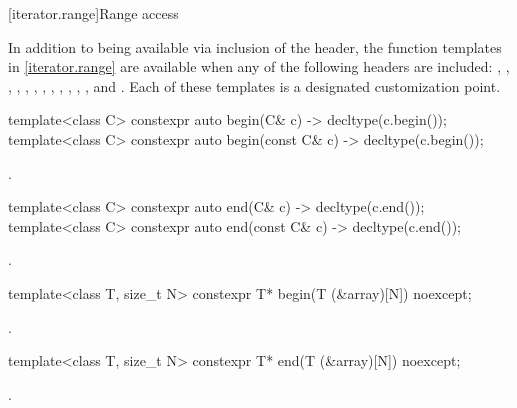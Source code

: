 [iterator.range]{Range access}

\pnum
In addition to being available via inclusion of the  header,
the function templates in \ref{iterator.range} are available when any of the following
headers are included:
,
,
,
,
,
,
,
,
,
,
,
, and
.
Each of these templates
is a designated customization point.

%
\begin{itemdecl}
template<class C> constexpr auto begin(C& c) -> decltype(c.begin());
template<class C> constexpr auto begin(const C& c) -> decltype(c.begin());
\end{itemdecl}

\begin{itemdescr}
\pnum
\returns
{}.
\end{itemdescr}

%
\begin{itemdecl}
template<class C> constexpr auto end(C& c) -> decltype(c.end());
template<class C> constexpr auto end(const C& c) -> decltype(c.end());
\end{itemdecl}

\begin{itemdescr}
\pnum
\returns
{}.
\end{itemdescr}

%
\begin{itemdecl}
template<class T, size_t N> constexpr T* begin(T (&array)[N]) noexcept;
\end{itemdecl}

\begin{itemdescr}
\pnum
\returns
{}.
\end{itemdescr}

%
\begin{itemdecl}
template<class T, size_t N> constexpr T* end(T (&array)[N]) noexcept;
\end{itemdecl}

\begin{itemdescr}
\pnum
\returns
{}.
\end{itemdescr}

